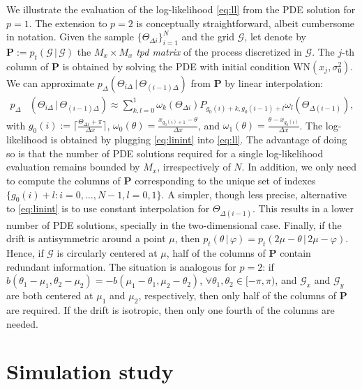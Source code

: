 \documentclass[oneside,11pt]{article}
\begin{document}
We illustrate the evaluation of the log-likelihood \eqref{eq:ll} from the PDE solution for $p=1$. The extension to $p=2$ is conceptually straightforward, albeit cumbersome in notation. Given the sample $\{\Theta_{\Delta i}\}_{i=1}^N$ and the grid $\mathcal{G}$, let denote by $\mathbf{P}:=p_t(\mathcal{G}\,|\,\mathcal{G})$ the $M_x\times M_x$ \textit{tpd matrix} of the process discretized in $\mathcal{G}$. The $j$-th column of $\mathbf{P}$ is obtained by solving the PDE with initial condition $\mathrm{WN}(x_j,\sigma^2_0)$. We can approximate $p_\Delta(\Theta_{i\Delta}\,|\,\Theta_{(i-1)\Delta})$ from $\mathbf{P}$ by linear interpolation:
\begin{align}
p_\Delta&(\Theta_{i\Delta}\,|\,\Theta_{(i-1)\Delta}) \approx\sum_{k,l=0}^1 \omega_{k}(\Theta_{\Delta i})P_{g_0(i)+k,g_0(i-1)+l}\omega_{l}(\Theta_{\Delta (i-1)}),\label{eq:linint}
\end{align}
with $g_0(i):=\lceil\frac{\Theta_{\Delta i}+\pi}{\Delta x}\rceil$, $\omega_0(\theta)=\frac{x_{g_0(i)+1}-\theta}{\Delta x}$, and $\omega_1(\theta)=\frac{\theta-x_{g_0(i)}}{\Delta x}$. The log-likelihood is obtained by plugging \eqref{eq:linint} into \eqref{eq:ll}. The advantage of doing so is that the number of PDE solutions required for a single log-likelihood evaluation remains bounded by $M_x$, irrespectively of $N$. In addition, we only need to compute the columns of $\mathbf{P}$ corresponding to the unique set of indexes $\{g_0(i)+l:i=0,\ldots,N-1,l=0,1\}$. A simpler, though less precise, alternative to \eqref{eq:linint} is to use constant interpolation for $\Theta_{\Delta (i-1)}$. This results in a lower number of PDE solutions, specially in the two-dimensional case. Finally, if the drift is antisymmetric around a point $\mu$, then $p_t(\theta\,|\,\varphi)=p_t(2\mu-\theta\,|\,2\mu-\varphi)$. Hence, if $\mathcal{G}$ is circularly centered at $\mu$, half of the columns of $\mathbf{P}$ contain redundant information. The situation is analogous for $p=2$: if $b(\theta_1-\mu_1,\theta_2-\mu_2)=-b(\mu_1-\theta_1,\mu_2-\theta_2)$, $\forall\theta_1,\theta_2\in[-\pi,\pi)$, and $\mathcal{G}_x$ and $\mathcal{G}_y$ are both centered at $\mu_1$ and $\mu_2$, respectively, then only half of the columns of $\mathbf{P}$ are required. If the drift is isotropic, then only one fourth of the columns are needed.

\section{Simulation study}
\label{sec:sim}
\end{document}
